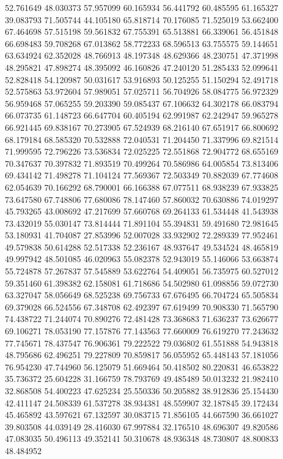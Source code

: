 52.761649
48.030373
57.957099
60.165934
56.441792
60.485595
61.165327
39.083793
71.505744
44.105180
65.818714
70.176085
71.525019
53.662400
67.464698
57.515198
59.561832
67.755391
65.513881
66.339061
56.451848
66.698483
59.708268
67.013862
58.772233
68.596513
63.755575
59.144651
63.634924
62.352028
48.766913
48.197348
48.629366
48.230751
47.371998
48.295821
47.898274
48.395092
46.160826
47.240120
51.285433
52.099641
52.828418
54.120987
50.031617
53.916893
50.125255
51.150294
52.491718
52.575863
53.972604
57.989051
57.025711
56.704926
58.084775
56.972329
56.959468
57.065255
59.203390
59.085437
67.106632
64.302178
66.083794
66.073735
61.148723
66.647704
60.405194
62.991987
62.242947
59.965278
66.921445
69.838167
70.273905
67.524939
68.216140
67.651917
66.800692
68.179184
68.585320
70.532888
72.040531
71.204450
71.337996
69.821514
71.999595
72.796226
73.536834
72.025225
72.551868
72.904772
68.655169
70.347637
70.397832
71.893519
70.499264
70.586986
64.005854
73.813406
69.434142
71.498278
71.104124
77.569367
72.503349
70.882039
67.774608
62.054639
70.166292
68.790001
66.166388
67.077511
68.938239
67.933825
73.647580
67.748806
77.680086
78.147460
57.860032
70.630886
74.019297
45.793265
43.008692
47.217699
57.660768
69.264133
61.534448
41.543938
73.432019
55.030147
73.814444
71.891104
55.394831
59.491680
72.981645
53.180931
41.704087
27.853996
52.007028
33.932902
72.289339
77.952461
49.579838
50.614288
52.517338
52.236167
48.937647
49.534524
48.465819
49.997942
48.501085
46.020963
55.082378
52.943019
55.146066
53.663874
55.724878
57.267837
57.545889
53.622764
54.409051
56.735975
60.527012
59.351460
61.398382
62.158081
61.718686
54.502980
61.098856
59.072730
63.327047
58.056649
68.525238
69.756733
67.676495
66.704724
65.505834
69.379028
66.524556
67.348708
62.492397
67.619499
70.908330
71.565790
74.438722
71.244074
70.890276
72.481428
73.368683
71.636237
73.626677
69.106271
78.053190
77.157876
77.143563
77.660009
76.619270
77.243632
77.745671
78.437547
76.906361
79.222522
79.036802
61.551888
54.943818
48.795686
62.496251
79.227809
70.859817
56.055952
65.448143
57.181056
76.954230
47.744960
56.125079
51.669464
50.418502
80.220831
46.653822
35.736372
25.604228
31.166759
78.793769
49.485489
50.013232
21.982410
32.868508
54.400223
47.625234
25.550336
50.205882
38.912836
25.154430
42.411147
24.508339
61.537278
38.934381
48.559907
32.187845
39.172434
45.465892
43.597621
67.132597
30.083715
71.856105
44.667590
36.661027
39.803508
44.039149
28.416030
67.997884
32.176510
48.696307
49.820586
47.083035
50.496113
49.352141
50.310678
48.936348
48.730807
48.800833
48.484952
